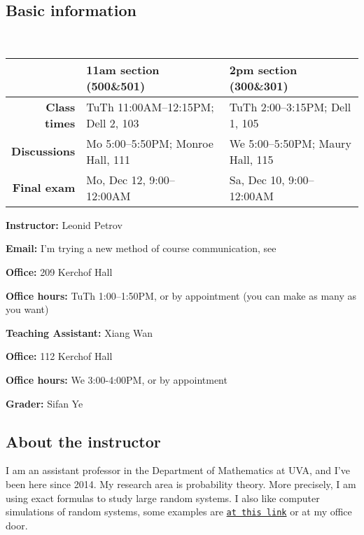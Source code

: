\documentclass[oneside,11pt]{amsart}
\begin{document}
\subsection{Basic information}{\ }

\vspace{5pt}

\begin{tabular}{r|l|l}
	\hline
	&\textbf{11am section (500\&501)} & \textbf{2pm section (300\&301)}
	\\\hline
	\textbf{Class times}&TuTh 11:00AM--12:15PM; Dell 2, 103 & TuTh 2:00--3:15PM; Dell 1, 105 
	\\\hline
	\textbf{Discussions}&Mo 5:00--5:50PM; Monroe Hall, 111
	&
	We 5:00--5:50PM; Maury Hall, 115
	\\\hline
	\textbf{Final exam}&
	Mo, Dec 12, 9:00--12:00AM&
	Sa, Dec 10,	9:00--12:00AM
	\\\hline
\end{tabular}

\vspace{10pt}

\parbox{.5\textwidth}{

\textbf{Instructor:} Leonid Petrov

\textbf{Email:} I'm trying a new method of course communication, see 

\textbf{Office:} 209 Kerchof Hall

\textbf{Office hours:} TuTh 1:00--1:50PM,
or by appointment (you can make as many as you want)}\hspace{30pt}
\parbox{.4\textwidth}{

\textbf{Teaching Assistant:} Xiang Wan

\textbf{Office:} 112 Kerchof Hall

\textbf{Office hours:} We 3:00-4:00PM, or by appointment

\vspace{15pt}

\textbf{Grader:} Sifan Ye}

\vspace{5pt}

\subsection{About the instructor}
I am an assistant professor in the Department of Mathematics at UVA, and I've been here since 2014. My research area is probability theory. More precisely, I am using exact formulas to study large random systems. I also like computer simulations of random systems, some examples are \href{http://faculty.virginia.edu/petrov//blog/2015/02/20/Shapes%20with%20holes/}{\texttt{at this link}} or at my office door.
\end{document}
